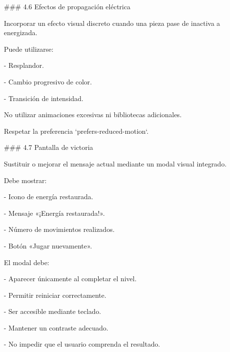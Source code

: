 \par\smallskip
\noindent \#\#\# 4.6 Efectos de propagación eléctrica\par
\par\smallskip
\noindent Incorporar un efecto visual discreto cuando una pieza pase de inactiva a energizada.\par
\par\smallskip
\noindent Puede utilizarse:\par
\par\smallskip
\noindent - Resplandor.\par
\noindent - Cambio progresivo de color.\par
\noindent - Transición de intensidad.\par
\par\smallskip
\noindent No utilizar animaciones excesivas ni bibliotecas adicionales.\par
\par\smallskip
\noindent Respetar la preferencia `prefers-reduced-motion`.\par
\par\smallskip
\noindent \#\#\# 4.7 Pantalla de victoria\par
\par\smallskip
\noindent Sustituir o mejorar el mensaje actual mediante un modal visual integrado.\par
\par\smallskip
\noindent Debe mostrar:\par
\par\smallskip
\noindent - Icono de energía restaurada.\par
\noindent - Mensaje «¡Energía restaurada!».\par
\noindent - Número de movimientos realizados.\par
\noindent - Botón «Jugar nuevamente».\par
\par\smallskip
\noindent El modal debe:\par
\par\smallskip
\noindent - Aparecer únicamente al completar el nivel.\par
\noindent - Permitir reiniciar correctamente.\par
\noindent - Ser accesible mediante teclado.\par
\noindent - Mantener un contraste adecuado.\par
\noindent - No impedir que el usuario comprenda el resultado.\par
\par\smallskip

